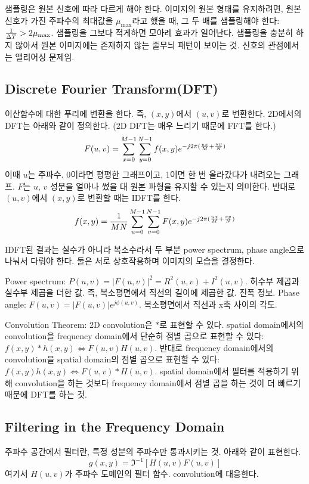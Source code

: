 샘플링은 원본 신호에 따라 다르게 해야 한다. 이미지의 원본 형태를 유지하려면, 원본 신호가 가진 주파수의 최대값을 $\mu_{\text{max}}$라고 했을 때, 그 두 배를 샘플링해야 한다: ${1 \over \Delta T} > 2 \mu_{\text{max}}$. 샘플링을 그보다 적게하면 모아레 효과가 일어난다. 샘플링을 충분히 하지 않아서 원본 이미지에는 존재하지 않는 줄무늬 패턴이 보이는 것. 신호의 관점에서는 앨리어싱 문제임.

\subsection{Discrete Fourier Transform(DFT)}

이산함수에 대한 푸리에 변환을 한다. 즉, $(x, y)$에서 $(u, v)$로 변환한다. 2D에서의 DFT는 아래와 같이 정의한다. (2D DFT는 매우 느리기 때문에 FFT를 한다.)
$$F(u, v) = \sum_{x=0}^{M-1} \sum_{y=0}^{N-1} f(x, y) e^{-j2\pi({ux \over M} + {uy \over N})}$$
이때 $u$는 주파수. 0이라면 평평한 그래프이고, 1이면 한 번 올라갔다가 내려오는 그래프. $F$는 $u$, $v$ 성분을 얼마나 썼을 대 원본 파형을 유지할 수 있는지 의미한다. 반대로 $(u, v)$에서 $(x, y)$로 변환할 때는 IDFT를 한다.
$$f(x, y) = {1 \over MN} \sum_{u=0}^{M-1} \sum_{v=0}^{N-1} F(x, y)e^{-j2\pi({ux \over M} + {vy \over N})}$$

IDFT된 결과는 실수가 아니라 복소수라서 두 부분 power spectrum, phase angle으로 나눠서 다뤄야 한다. 둘은 서로 상호작용하며 이미지의 모습을 결정한다.

\bitmz
  \itm Power spectrum: $P(u, v) = |F(u, v)|^2 = R^2(u, v) + I^2(u, v)$. 허수부 제곱과 실수부 제곱을 더한 값. 즉, 복소평면에서 직선의 길이에 제곱한 값. 진폭 정보.
  \itm Phase angle: $F(u, v) = |F(u, v)|e^{j\phi(u, v)}$. 복소평면에서 직선과 x축 사이의 각도.
\eitmz

Convolution Theorem: 2D convolution은 $\ast$로 표현할 수 있다. spatial domain에서의 convolution을 frequency domain에서 단순히 점별 곱으로 표현할 수 있다: $f(x, y) \ast h(x, y) \Leftrightarrow F(u, v)H(u, v)$. 반대로 frequency domain에서의 convolution을 spatial domain의 점별 곱으로 표현할 수 있다: $f(x, y)h(x, y) \Leftrightarrow F(u, v) \ast H(u, v)$. spatial domain에서 필터를 적용하기 위해 convolution을 하는 것보다 frequency domain에서 점별 곱을 하는 것이 더 빠르기 때문에 DFT를 하는 것.

\subsection{Filtering in the Frequency Domain}

주파수 공간에서 필터란, 특정 성분의 주파수만 통과시키는 것. 아래와 같이 표현한다.
$$g(x, y) = \Im^{-1}[H(u, v)F(u, v)]$$
여기서 $H(u, v)$가 주파수 도메인의 필터 함수. convolution에 대응한다.

